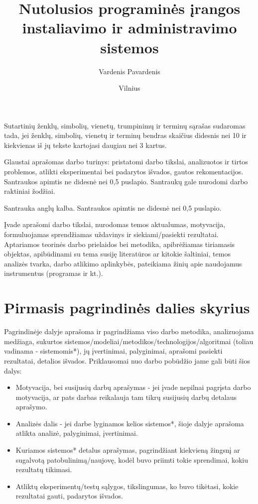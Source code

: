 \documentclass[fleqn]{VUMIFKompMagistrinis}
\institute{Informatikos institutas}  %
\title{Nutolusios programinės įrangos instaliavimo ir administravimo sistemos}
\author{Vardenis Pavardenis}
\date{Vilnius \\ \the\year}
\begin{document}
\maketitle

\tableofcontents

Sutartinių ženklų, simbolių, vienetų, trumpinimų ir terminų sąrašas sudaromas
tada, jei ženklų, simbolių, vienetų ir terminų bendras skaičius didesnis nei 10
ir kiekvienas iš jų tekste kartojasi daugiau nei 3 kartus. 

Glaustai aprašomas darbo turinys: pristatomi darbo tikslai, analizuotos ir
tirtos problemos, atlikti eksperimentai bei padarytos išvados, gautos
rekomentacijos. Santraukos apimtis ne didesnė nei 0,5 puslapio. Santraukų gale
nurodomi darbo raktiniai žodžiai. 

Santrauka anglų kalba. Santraukos apimtis ne didesnė nei 0,5 puslapio.


Įvade aprašomi darbo tikslai, nurodomas temos aktualumas, motyvacija,
formuluojamas sprendžiamas uždavinys ir siekiami/pasiekti rezultatai.
Aptariamos teorinės darbo prielaidos bei metodika, apibrėžiamas tiriamasis
objektas, apibūdinami su tema susiję literatūros ar kitokie šaltiniai, temos
analizės tvarka, darbo atlikimo aplinkybės, pateikiama žinių apie naudojamus
instrumentus (programas ir kt.).

\section{Pirmasis pagrindinės dalies skyrius}
Pagrindinėje dalyje aprašoma ir pagrindžiama viso darbo metodika, analizuojama
medžiaga, sukurtos sistemos/modeliai/metodikos/technologijos/algoritmai (toliau
vadinama - sistemomis*), jų įvertinimai, palyginimai, aprašomi pasiekti
rezultatai, detalios išvados. Priklausomai nuo darbo pobūdžio jame gali būti
šios dalys:
\begin{itemize}
    \item Motyvacija, bei susijusių darbų aprašymas - jei įvade nepilnai
        pagrįsta darbo motyvacija, ar pats darbas reikalauja tam tikrų
        susijusių darbų detalaus aprašymo.
    \item Analizės dalis - jei darbe lyginamos kelios sistemos*, šioje dalyje
        aprašoma atlikta analizė, palyginimai, įvertinimai.
    \item Kuriamos sistemos* detalus aprašymas, pagrindžiant kiekvieną žingsnį
        ar sugalvotą patobulinimą/naujovę, kodėl buvo priimti tokie sprendimai,
        kokiu rezultatų tikimasi.
    \item Atliktų eksperimentų/testų sąlygos, tikslingumas, ko buvo tikėtasi,
        kokie rezultatai gauti, padarytos išvados.
\end{itemize}
\end{document}
